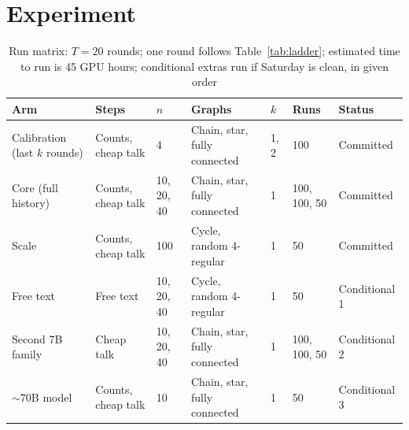 \section{Experiment}
\label{sec:experiment}


\begin{table}[ht]
  \centering\footnotesize
  \setlength{\tabcolsep}{4pt}
  \begin{tabular}{@{}p{}llllll@{}}
    \toprule
    Arm & Steps & $n$ & Graphs & $k$ & Runs & Status \\
    \midrule
    Calibration (last $k$ rounds) & Counts, cheap talk & 4          & Chain, star, fully connected & 1, 2 & 100          & Committed \\
    Core (full history)           & Counts, cheap talk & 10, 20, 40 & Chain, star, fully connected & 1    & 100, 100, 50 & Committed \\
    Scale                         & Counts, cheap talk & 100        & Cycle, random 4-regular      & 1    & 50           & Committed \\
    \midrule
    Free text                     & Free text          & 10, 20, 40 & Cycle, random 4-regular      & 1    & 50           & Conditional 1 \\
    Second 7B family              & Cheap talk         & 10, 20, 40 & Chain, star, fully connected & 1    & 100, 100, 50 & Conditional 2 \\
    $\sim$70B model               & Counts, cheap talk & 10         & Chain, star, fully connected & 1    & 50           & Conditional 3 \\
    \bottomrule
  \end{tabular}
  \caption{Run matrix: $T = 20$ rounds; one round follows Table~\ref{tab:ladder}; estimated time to run is 45 GPU hours; conditional extras run if Saturday is clean, in given order}
  \label{tab:runs}
\end{table}

